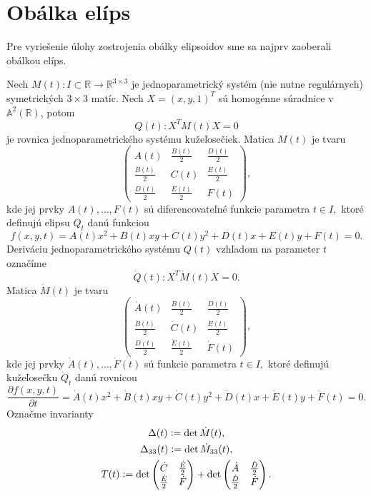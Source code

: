 \section{Obálka elíps}
Pre vyriešenie úlohy zostrojenia obálky elipsoidov sme sa najprv zaoberali obálkou elíps.

Nech $M(t) \colon I \subset \mathbb{R} \rightarrow \mathbb{R}^{3 \times 3}$ je jednoparametrický systém (nie nutne regulárnych) symetrických $3 \times 3$ matíc. Nech $ X = (x, y, 1)^T$ sú homogénne súradnice v $\mathbb{A}^2(\mathbb{R})$, potom
\begin{equation*}
Q(t) \colon X^T M(t) X = 0 
\end{equation*}
je rovnica jednoparametrického systému kužeľosečiek. 
Matica $M(t)$ je tvaru
$$
\left(\begin{matrix} 
A(t) & \frac{B(t)}{2} & \frac{D(t)}{2} \\
\frac{B(t)}{2} & C(t) & \frac{E(t)}{2} \\
\frac{D(t)}{2} & \frac{E(t)}{2} & F(t) 
\end{matrix} \right),
$$
kde jej prvky $A(t), \dots, F(t)$ sú diferencovateľné funkcie parametra $t \in I,$ ktoré definujú elipsu $Q_t$ danú funkciou 
$$f(x, y, t) = A(t)x^2 + B(t)xy + C(t)y^2 + D(t)x + E(t)y + F(t) = 0.$$
Deriváciu jednoparametrického systému $Q(t)$ vzhľadom na parameter $t$ označíme
\begin{equation*}
\dot{Q}(t) \colon X^T \dot{M}(t) X = 0.
\end{equation*}
Matica $\dot{M}(t)$ je tvaru
$$
\left(\begin{matrix} 
\dot{A}(t) & \frac{\dot{B}(t)}{2} & \frac{\dot{D}(t)}{2} \\
\frac{\dot{B}(t)}{2} & \dot{C}(t) & \frac{\dot{E}(t)}{2} \\
\frac{\dot{D}(t)}{2} & \frac{\dot{E}(t)}{2} & \dot{F}(t) 
\end{matrix} \right),
$$
kde jej prvky $\dot{A}(t), \dots, \dot{F}(t)$ sú funkcie parametra $t \in I,$ ktoré definujú kužeľosečku $\dot{Q}_t$ danú rovnicou 
$$\dfrac{\partial f(x, y, t)}{\partial t} = \dot{A}(t)x^2 + \dot{B}(t)xy + \dot{C}(t)y^2 + \dot{D}(t)x + \dot{E}(t)y + \dot{F}(t) = 0.$$
Označme invarianty 
\begin{gather*}
\Delta(t) \vcentcolon = \det \dot{M}(t), \\
\Delta_{33}(t) \vcentcolon = \det \dot{M}_{33}(t), \\
T(t) \vcentcolon = \det \left( \begin{matrix}
\dot{C} & \frac{\dot{E}}{2} \\ 
\frac{\dot{E}}{2} & \dot{F}
\end{matrix} \right) + \det \left( \begin{matrix}
\dot{A} & \frac{\dot{D}}{2} \\ 
\frac{\dot{D}}{2} & \dot{F}
\end{matrix} \right).
\end{gather*}
